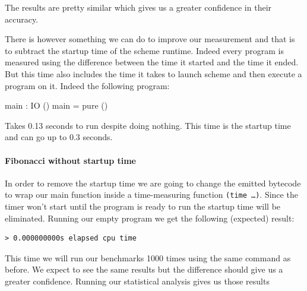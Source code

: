 \documentclass[
]{article}
\newenvironment{Shaded}{}{}
\newcommand{\DataTypeTok}[1]{\textcolor[rgb]{0.56,0.13,0.00}{#1}}
\newcommand{\FunctionTok}[1]{\textcolor[rgb]{0.02,0.16,0.49}{#1}}
\newcommand{\NormalTok}[1]{#1}
\newcommand{\OperatorTok}[1]{\textcolor[rgb]{0.40,0.40,0.40}{#1}}
\newcommand{\OtherTok}[1]{\textcolor[rgb]{0.00,0.44,0.13}{#1}}
\begin{document}
The results are pretty similar which gives us a greater confidence in
their accuracy.

There is however something we can do to improve our measurement and that
is to subtract the startup time of the scheme runtime. Indeed every
program is measured using the difference between the time it started and
the time it ended. But this time also includes the time it takes to
launch scheme and then execute a program on it. Indeed the following
program:

\begin{Shaded}
\begin{Highlighting}[]
\NormalTok{main }\OperatorTok{:} \DataTypeTok{IO}\NormalTok{ ()}
\NormalTok{main }\OtherTok{=} \FunctionTok{pure}\NormalTok{ ()}
\end{Highlighting}
\end{Shaded}

Takes 0.13 seconds to run despite doing nothing. This time is the
startup time and can go up to 0.3 seconds.

\hypertarget{fibonacci-without-startup-time}{%
\paragraph{Fibonacci without startup
time}\label{fibonacci-without-startup-time}}

In order to remove the startup time we are going to change the emitted
bytecode to wrap our main function inside a time-measuring function
\texttt{(time\ \ldots{})}. Since the timer won't start until the program
is ready to run the startup time will be eliminated. Running our empty
program we get the following (expected) result:

\begin{verbatim}
> 0.000000000s elapsed cpu time
\end{verbatim}

This time we will run our benchmarks 1000 times using the same command
as before. We expect to see the same results but the difference should
give us a greater confidence. Running our statistical analysis gives us
those results
\end{document}
